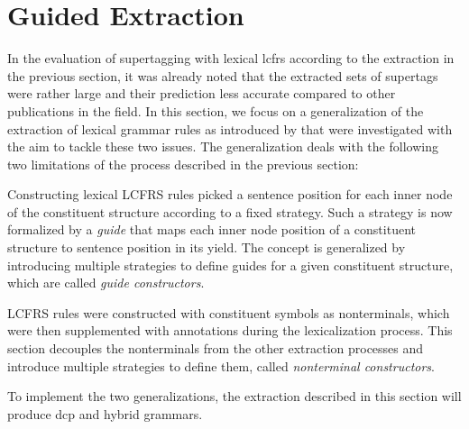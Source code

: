 \documentclass[../document.tex]{subfiles}
\begin{document}
    \section{Guided Extraction} \label{sec:extraction:guided}
    In the evaluation of supertagging with lexical \gls*{lcfrs} according to the extraction in the previous section, it was already noted that the extracted sets of supertags were rather large and their prediction less accurate compared to other publications in the field. \cite{RupMoe21}
    In this section, we focus on a generalization of the extraction of lexical grammar rules as introduced by \citet{Rup22} that were investigated with the aim to tackle these two issues.
    The generalization deals with the following two limitations of the process described in the previous section:
    \begin{compactenum}
        \item
            Constructing lexical LCFRS rules picked a sentence position for each inner node of the constituent structure according to a fixed strategy.
            Such a strategy is now formalized by a \emph{guide} that maps each inner node position of a constituent structure to sentence position in its yield.
            The concept is generalized by introducing multiple strategies to define guides for a given constituent structure, which are called \emph{guide constructors}.
        \item
            LCFRS rules were constructed with constituent symbols as nonterminals, which were then supplemented with annotations during the lexicalization process.
            This section decouples the nonterminals from the other extraction processes and introduce multiple strategies to define them, called \emph{nonterminal constructors}.
    \end{compactenum}
    To implement the two generalizations, the extraction described in this section will produce \gls*{dcp} and hybrid grammars.
\end{document}
